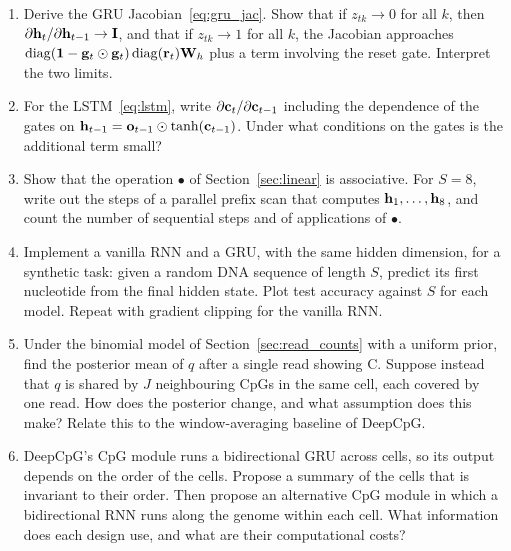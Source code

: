 \begin{enumerate}
  \item Derive the GRU Jacobian~\eqref{eq:gru_jac}. Show that if $z_{tk}\to0$ for all $k$, then $\partial\mathbf{h}_t/\partial\mathbf{h}_{t-1}\to\mathbf{I}$, and that if $z_{tk}\to1$ for all $k$, the Jacobian approaches $\operatorname{diag}(\mathbf{1}-\mathbf{g}_t\odot\mathbf{g}_t)\operatorname{diag}(\mathbf{r}_t)\mathbf{W}_h$ plus a term involving the reset gate. Interpret the two limits.
  \item For the LSTM~\eqref{eq:lstm}, write $\partial\mathbf{c}_t/\partial\mathbf{c}_{t-1}$ including the dependence of the gates on $\mathbf{h}_{t-1}=\mathbf{o}_{t-1}\odot\tanh(\mathbf{c}_{t-1})$. Under what conditions on the gates is the additional term small?
  \item Show that the operation $\bullet$ of Section~\ref{sec:linear} is associative. For $S=8$, write out the steps of a parallel prefix scan that computes $\mathbf{h}_1,\dots,\mathbf{h}_8$, and count the number of sequential steps and of applications of $\bullet$.
  \item Implement a vanilla RNN and a GRU, with the same hidden dimension, for a synthetic task: given a random DNA sequence of length $S$, predict its first nucleotide from the final hidden state. Plot test accuracy against $S$ for each model. Repeat with gradient clipping for the vanilla RNN.
  \item Under the binomial model of Section~\ref{sec:read_counts} with a uniform prior, find the posterior mean of $q$ after a single read showing C. Suppose instead that $q$ is shared by $J$ neighbouring CpGs in the same cell, each covered by one read. How does the posterior change, and what assumption does this make? Relate this to the window-averaging baseline of DeepCpG.
  \item DeepCpG's CpG module runs a bidirectional GRU across cells, so its output depends on the order of the cells. Propose a summary of the cells that is invariant to their order. Then propose an alternative CpG module in which a bidirectional RNN runs along the genome within each cell. What information does each design use, and what are their computational costs?
\end{enumerate}
